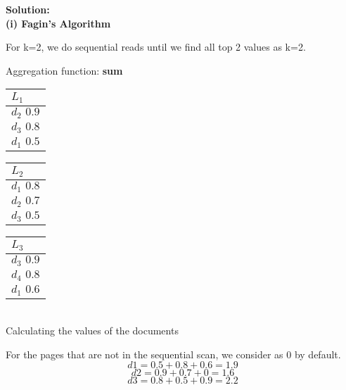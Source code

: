 \textbf{Solution:} 
\\
\textbf{(i) Fagin's Algorithm}

For k=2, we do sequential reads until we find all top 2 values as k=2.

Aggregation function: \textbf{sum}

    \begin{center}
      \begin{minipage}[t]{2cm}
        \begin{tabular}{|p{25pt}|}\hline
          $L_1$\\\hline
          $d_2 \, \, 0.9$\\\hline
          $d_3 \, \, 0.8$\\\hline
          $d_1 \, \, 0.5$\\\hline
        \end{tabular}
    \end{minipage}
    \hspace{5mm}
    \begin{minipage}[t]{2cm}
        \begin{tabular}{|p{25pt}|}\hline
          $L_2$\\\hline
          $d_1 \, \, 0.8$\\\hline
          $d_2 \, \, 0.7$\\\hline
          $d_3 \, \, 0.5$\\\hline
        \end{tabular}
    \end{minipage}
    \hspace{5mm}
    \begin{minipage}[t]{2cm}
        \begin{tabular}{|p{25pt}|}\hline
        $L_3$\\\hline
        $d_3 \, \, 0.9$\\\hline
        $d_4 \, \, 0.8$\\\hline
        $d_1 \, \, 0.6$\\\hline
        \end{tabular}
    \end{minipage}
    \end{center}
\\


Calculating the values of the documents

For the pages that are not in the sequential scan, we consider as 0 by default.
\[d1 = 0.5 + 0.8 + 0.6 = 1.9 \] 
\[d2 = 0.9 + 0.7 + 0 = 1.6 \]
\[d3 = 0.8 + 0.5 + 0.9 = 2.2 \]

